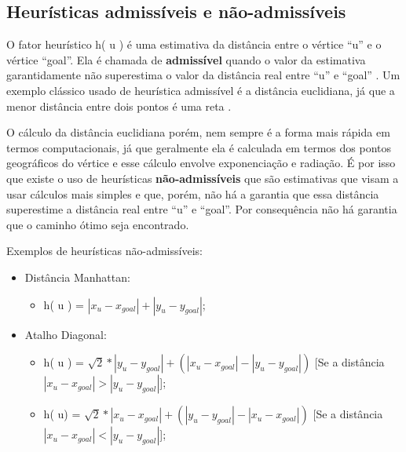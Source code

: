 \subsection{Heurísticas admissíveis e não-admissíveis}
\label{sec-aestrela-algoritmo-heuristica}  
O fator heurístico h( u ) é uma estimativa da distância entre o vértice ``u'' e o vértice ``goal''. Ela é chamada de \textbf{admissível} quando o valor da estimativa garantidamente não superestima o valor da distância real entre ``u'' e ``goal'' \cite{russell1995modern}. Um exemplo clássico usado de heurística admissível é a distância euclidiana, já que a menor distância entre dois pontos é uma reta \cite{russell1995modern}.

O cálculo da distância euclidiana porém, nem sempre é a forma mais rápida em termos computacionais, já que geralmente ela é calculada em termos dos pontos geográficos do vértice e esse cálculo envolve exponenciação e radiação. É por isso que existe o uso de heurísticas \textbf{não-admissíveis} que são estimativas que visam a usar cálculos mais simples e que, porém, não há a garantia que essa distância superestime a distância real entre ``u'' e ``goal''. Por consequência não há garantia que o caminho ótimo seja encontrado.

Exemplos de heurísticas não-admissíveis:
\begin{itemize}
\item Distância Manhattan:
\begin{itemize}
\item h( u ) = $| x_{u} - x_{goal} | + | y_{u} - y_{goal}|$;
\end{itemize}
\item Atalho Diagonal:
\begin{itemize}
\item h( u ) = $\sqrt{2} * | y_{u} - y_{goal}| + ( | x_{u} - x_{goal} | - | y_{u} - y_{goal}| )$ [Se a distância $| x_{u} - x_{goal} | > | y_{u} - y_{goal}|$];
\item h( u) = $\sqrt{2} * | x_{u} - x_{goal}| + ( | y_{u} - y_{goal}| - | x_{u} - x_{goal} | )$ [Se a distância $| x_{u} - x_{goal} | < | y_{u} - y_{goal}|$];
\end{itemize}
\end{itemize}